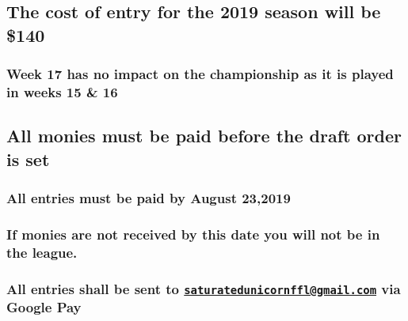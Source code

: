 \documentclass[]{book}
\begin{document}
\hypertarget{the-cost-of-entry-for-the-2019-season-will-be-140}{%
\subsection{The cost of entry for the 2019 season will be \$140}\label{the-cost-of-entry-for-the-2019-season-will-be-140}}

\hypertarget{week-17-has-no-impact-on-the-championship-as-it-is-played-in-weeks-15-16}{%
\subsubsection{Week 17 has no impact on the championship as it is played in weeks 15 \& 16}\label{week-17-has-no-impact-on-the-championship-as-it-is-played-in-weeks-15-16}}

\hypertarget{all-monies-must-be-paid-before-the-draft-order-is-set}{%
\subsection{All monies must be paid before the draft order is set}\label{all-monies-must-be-paid-before-the-draft-order-is-set}}

\hypertarget{all-entries-must-be-paid-by-august-232019}{%
\subsubsection{All entries must be paid by August 23,2019}\label{all-entries-must-be-paid-by-august-232019}}

\hypertarget{if-monies-are-not-received-by-this-date-you-will-not-be-in-the-league.}{%
\subsubsection{If monies are not received by this date you will not be in the league.}\label{if-monies-are-not-received-by-this-date-you-will-not-be-in-the-league.}}

\hypertarget{all-entries-shall-be-sent-to-saturatedunicornfflgmail.com-via-google-pay}{%
\subsubsection{\texorpdfstring{All entries shall be sent to \href{mailto:saturatedunicornffl@gmail.com}{\nolinkurl{saturatedunicornffl@gmail.com}} via Google Pay}{All entries shall be sent to saturatedunicornffl@gmail.com via Google Pay}}\label{all-entries-shall-be-sent-to-saturatedunicornfflgmail.com-via-google-pay}}
\end{document}
